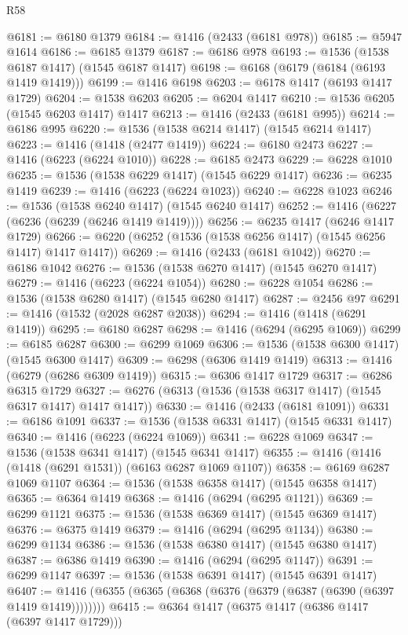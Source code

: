 \begin{lexlean}{R58}
\begin{coremodule}
{{@6181 := @6180 @1379
@6184 := @1416 (@2433 (@6181 @978))
@6185 := @5947 @1614
@6186 := @6185 @1379
@6187 := @6186 @978
@6193 := @1536 (@1538 @6187 @1417) (@1545 @6187 @1417)
@6198 := @6168 (@6179 (@6184 (@6193 @1419 @1419)))
@6199 := @1416 @6198
@6203 := @6178 @1417 (@6193 @1417 @1729)
@6204 := @1538 @6203
@6205 := @6204 @1417
@6210 := @1536 @6205 (@1545 @6203 @1417) @1417
@6213 := @1416 (@2433 (@6181 @995))
@6214 := @6186 @995
@6220 := @1536 (@1538 @6214 @1417) (@1545 @6214 @1417)
@6223 := @1416 (@1418 (@2477 @1419))
@6224 := @6180 @2473
@6227 := @1416 (@6223 (@6224 @1010))
@6228 := @6185 @2473
@6229 := @6228 @1010
@6235 := @1536 (@1538 @6229 @1417) (@1545 @6229 @1417)
@6236 := @6235 @1419
@6239 := @1416 (@6223 (@6224 @1023))
@6240 := @6228 @1023
@6246 := @1536 (@1538 @6240 @1417) (@1545 @6240 @1417)
@6252 := @1416 (@6227 (@6236 (@6239 (@6246 @1419 @1419))))
@6256 := @6235 @1417 (@6246 @1417 @1729)
@6266 := @6220 (@6252 (@1536 (@1538 @6256 @1417) (@1545 @6256 @1417) @1417 @1417))
@6269 := @1416 (@2433 (@6181 @1042))
@6270 := @6186 @1042
@6276 := @1536 (@1538 @6270 @1417) (@1545 @6270 @1417)
@6279 := @1416 (@6223 (@6224 @1054))
@6280 := @6228 @1054
@6286 := @1536 (@1538 @6280 @1417) (@1545 @6280 @1417)
@6287 := @2456 @97
@6291 := @1416 (@1532 (@2028 @6287 @2038))
@6294 := @1416 (@1418 (@6291 @1419))
@6295 := @6180 @6287
@6298 := @1416 (@6294 (@6295 @1069))
@6299 := @6185 @6287
@6300 := @6299 @1069
@6306 := @1536 (@1538 @6300 @1417) (@1545 @6300 @1417)
@6309 := @6298 (@6306 @1419 @1419)
@6313 := @1416 (@6279 (@6286 @6309 @1419))
@6315 := @6306 @1417 @1729
@6317 := @6286 @6315 @1729
@6327 := @6276 (@6313 (@1536 (@1538 @6317 @1417) (@1545 @6317 @1417) @1417 @1417))
@6330 := @1416 (@2433 (@6181 @1091))
@6331 := @6186 @1091
@6337 := @1536 (@1538 @6331 @1417) (@1545 @6331 @1417)
@6340 := @1416 (@6223 (@6224 @1069))
@6341 := @6228 @1069
@6347 := @1536 (@1538 @6341 @1417) (@1545 @6341 @1417)
@6355 := @1416 (@1416 (@1418 (@6291 @1531)) (@6163 @6287 @1069 @1107))
@6358 := @6169 @6287 @1069 @1107
@6364 := @1536 (@1538 @6358 @1417) (@1545 @6358 @1417)
@6365 := @6364 @1419
@6368 := @1416 (@6294 (@6295 @1121))
@6369 := @6299 @1121
@6375 := @1536 (@1538 @6369 @1417) (@1545 @6369 @1417)
@6376 := @6375 @1419
@6379 := @1416 (@6294 (@6295 @1134))
@6380 := @6299 @1134
@6386 := @1536 (@1538 @6380 @1417) (@1545 @6380 @1417)
@6387 := @6386 @1419
@6390 := @1416 (@6294 (@6295 @1147))
@6391 := @6299 @1147
@6397 := @1536 (@1538 @6391 @1417) (@1545 @6391 @1417)
@6407 := @1416 (@6355 (@6365 (@6368 (@6376 (@6379 (@6387 (@6390 (@6397 @1419 @1419))))))))
@6415 := @6364 @1417 (@6375 @1417 (@6386 @1417 (@6397 @1417 @1729)))
}}
\end{coremodule}
\end{lexlean}
